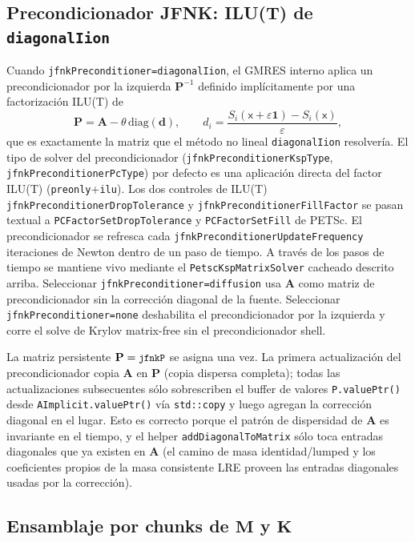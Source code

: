 \documentclass[11pt,a4paper]{article}
\newcommand{\code}[1]{\texttt{\small #1}}
\newcommand{\Mmass}{\mathbf{M}}
\newcommand{\Kstif}{\mathbf{K}}
\newcommand{\Aimp}{\mathbf{A}}
\begin{document}
\subsection{Precondicionador JFNK: ILU(T) de \texorpdfstring{\code{diagonalIion}}{diagonalIion}}

Cuando \code{jfnkPreconditioner=diagonalIion}, el GMRES interno aplica un precondicionador
por la izquierda $\mathbf{P}^{-1}$ definido implícitamente por una factorización ILU(T) de
\begin{equation}
  \mathbf{P}
  =
  \Aimp - \theta\,\mathrm{diag}(\mathbf{d}),
  \qquad
  d_i =
  \frac{S_i(\mathsf{x}+\varepsilon\mathbf{1})-S_i(\mathsf{x})}{\varepsilon},
  \label{eq:jfnk-pc-matrix}
\end{equation}
que es exactamente la matriz que el método no lineal \code{diagonalIion} resolvería. El tipo
de solver del precondicionador (\code{jfnkPreconditionerKspType},
\code{jfnkPreconditionerPcType}) por defecto es una aplicación directa del factor ILU(T)
(\code{preonly}+\code{ilu}). Los dos controles de ILU(T)
\code{jfnkPreconditionerDropTolerance} y \code{jfnkPreconditionerFillFactor} se pasan textual
a \code{PCFactorSetDropTolerance} y \code{PCFactorSetFill} de PETSc. El precondicionador se
refresca cada \code{jfnkPreconditionerUpdateFrequency} iteraciones de Newton dentro de un
paso de tiempo. A través de los pasos de tiempo se mantiene vivo mediante el
\code{PetscKspMatrixSolver} cacheado descrito arriba. Seleccionar
\code{jfnkPreconditioner=diffusion} usa $\Aimp$ como matriz de precondicionador sin la
corrección diagonal de la fuente. Seleccionar \code{jfnkPreconditioner=none} deshabilita el
precondicionador por la izquierda y corre el solve de Krylov matrix-free sin el
precondicionador shell.

La matriz persistente $\mathbf{P}=\code{jfnkP}$ se asigna una vez. La primera actualización
del precondicionador copia $\Aimp$ en $\mathbf{P}$ (copia dispersa completa); todas las
actualizaciones subsecuentes sólo sobrescriben el buffer de valores \code{P.valuePtr()} desde
\code{AImplicit.valuePtr()} vía \code{std::copy} y luego agregan la corrección diagonal en el
lugar. Esto es correcto porque el patrón de dispersidad de $\Aimp$ es invariante en el tiempo,
y el helper \code{addDiagonalToMatrix} sólo toca entradas diagonales que ya existen en $\Aimp$
(el camino de masa identidad/lumped y los coeficientes propios de la masa consistente LRE
proveen las entradas diagonales usadas por la corrección).

\subsection{Ensamblaje por chunks de \texorpdfstring{$\Mmass$}{M} y
\texorpdfstring{$\Kstif$}{K}}
\label{sec:chunked-assembly}
\end{document}
